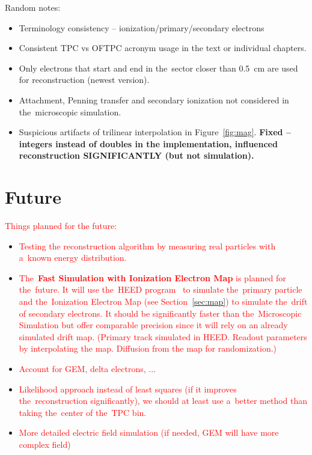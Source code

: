 {\begin{itemize}[topsep=4pt,itemsep=2pt]
			\end{itemize}
			Random notes:
			\begin{itemize}[topsep=4pt,itemsep=2pt]
				\item Terminology consistency -- ionization/primary/secondary electrons
				\item Consistent \ac{TPC} vs \ac{OFTPC} acronym usage in the text or individual chapters.
				\item Only electrons that start and end in the~sector closer than 0.5~cm are used for reconstruction (newest version).
				\item Attachment, Penning transfer and secondary ionization not considered in the~microscopic simulation.
				\item Suspicious artifacts of trilinear interpolation in Figure~\ref{fig:mag}. \textbf{Fixed -- integers instead of doubles in the implementation, influenced reconstruction SIGNIFICANTLY (but not simulation).}
			\end{itemize}
		}
	\section*{Future}
		\textcolor{red}{Things planned for the future:}
		\begin{itemize}[topsep=4pt,itemsep=2pt]
			\item \textcolor{red}{Testing the reconstruction algorithm by measuring real particles with a~known energy distribution.}
			\item \textcolor{red}{The~\textbf{Fast Simulation with Ionization Electron Map} is planned for the~future. It will use the~\ac{HEED} program~\cite{HEED} to simulate the~primary particle and the~Ionization Electron Map (see Section~\ref{sec:map}) to simulate the~drift of secondary electrons. It should be significantly faster than the~Microscopic Simulation but offer comparable precision since it will rely on an already simulated drift map. (Primary track simulated in HEED. Readout parameters by interpolating the map.	Diffusion from the map for randomization.)}
			\item \textcolor{red}{Account for GEM, delta electrons, ...}
			\item \textcolor{red}{Likelihood approach instead of least squares (if it improves the~reconstruction significantly), we should at least use a~better method than taking the~center of the~TPC bin.}
			\item \textcolor{red}{More detailed electric field simulation (if needed, GEM will have more complex field)}
		\end{itemize}
		
